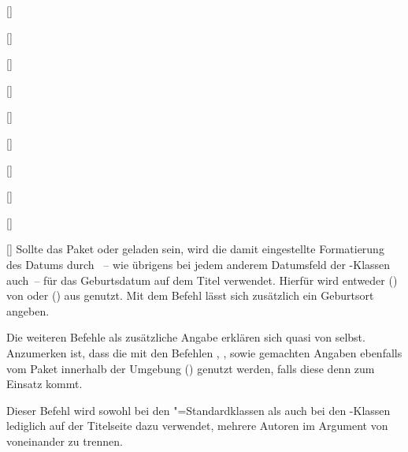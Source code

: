 \begin{Declaration*}{}
\begin{Declaration*}{}
\begin{Declaration*}{}
\begin{Declaration}{[]}
\begin{Declaration}{[]}
\begin{Declaration}{%
  []%
}
\begin{Declaration}{[]}
\begin{Declaration}{[]}
\begin{Declaration}{[]}
\begin{Declaration}{[]}
\begin{Declaration}{[]}
\begin{Declaration}{[]}
\begin{Declaration}{[]}
Sollte das Paket  oder  geladen sein, wird 
die damit eingestellte Formatierung des Datums durch ~-- wie 
übrigens bei jedem anderem Datumsfeld der \TUDScript-Klassen auch~-- für das 
Geburtsdatum auf dem Titel verwendet. Hierfür wird entweder  
() von  oder 
() aus  genutzt. Mit dem 
Befehl  lässt sich zusätzlich ein Geburtsort angeben.

Die weiteren Befehle als zusätzliche Angabe erklären sich quasi von selbst. 
Anzumerken ist, dass die mit den Befehlen ,  
,  sowie  gemachten 
Angaben ebenfalls vom Paket  innerhalb der 
Umgebung () genutzt werden, falls 
diese denn zum Einsatz kommt.
\end{Declaration}
\end{Declaration}
\end{Declaration}
\end{Declaration}
\end{Declaration}
\end{Declaration}
\end{Declaration}
\end{Declaration}
\end{Declaration}
\end{Declaration}

\begin{Declaration}{}
\printdeclarationlist%
%
%
Dieser Befehl wird sowohl bei den "=Standardklassen als auch bei 
den \KOMAScript-Klassen lediglich auf der Titelseite dazu verwendet, mehrere 
Autoren im Argument von  voneinander zu trennen.


\end{Declaration}
\end{Declaration*}
\end{Declaration*}
\end{Declaration*}

